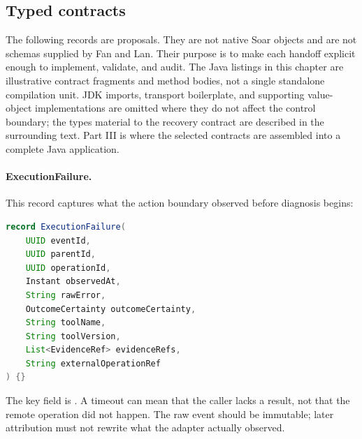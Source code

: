 
\subsection{Typed contracts}
\label{subsec:ch13-contracts}

The following records are \EngineeringLabel{} proposals. They are not native Soar objects and are not schemas supplied by Fan and Lan. Their purpose is to make each handoff explicit enough to implement, validate, and audit. The Java listings in this chapter are illustrative contract fragments and method bodies, not a single standalone compilation unit. JDK imports, transport boilerplate, and supporting value-object implementations are omitted where they do not affect the control boundary; the types material to the recovery contract are described in the surrounding text. Part III is where the selected contracts are assembled into a complete Java application.

\paragraph{ExecutionFailure.}

This record captures what the action boundary observed before diagnosis begins:

\begin{lstlisting}[language=Java,caption={Raw action-boundary event (illustrative Java record).},label={lst:ch13-execution-failure}]
record ExecutionFailure(
    UUID eventId,
    UUID parentId,
    UUID operationId,
    Instant observedAt,
    String rawError,
    OutcomeCertainty outcomeCertainty,
    String toolName,
    String toolVersion,
    List<EvidenceRef> evidenceRefs,
    String externalOperationRef
) {}
\end{lstlisting}

The key field is . A timeout can mean that the caller lacks a result, not that the remote operation did not happen. The raw event should be immutable; later attribution must not rewrite what the adapter actually observed.

